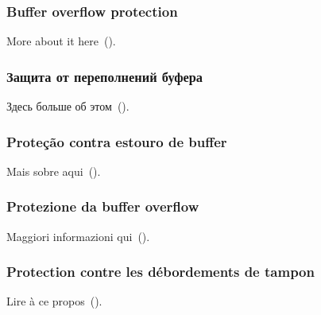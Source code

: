 \ifdefined\ENGLISH
\subsubsection{Buffer overflow protection}

More about it here~().
\fi

\ifdefined\RUSSIAN
\subsubsection{Защита от переполнений буфера}

Здесь больше об этом~().
\fi

\ifdefined\BRAZILIAN
\subsubsection{Proteção contra estouro de buffer}

Mais sobre aqui~().
\fi

\ifdefined\ITALIAN
\subsubsection{Protezione da buffer overflow}

Maggiori informazioni qui~().
\fi

\ifdefined\FRENCH
\subsubsection{Protection contre les débordements de tampon}

Lire à ce propos~().
\fi
